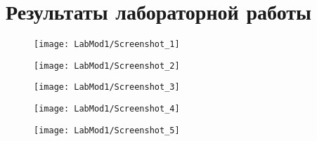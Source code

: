 \documentclass[a4paper,12pt]{article}
\begin{document}
\section{Результаты лабораторной работы}
\begin{figure}
	\centering
	\texttt{[image: LabMod1/Screenshot\_1]}
	\caption{}
	\label{fig:screenshot1}
\end{figure}
\begin{figure}
	\centering
	\texttt{[image: LabMod1/Screenshot\_2]}
	\caption{}
	\label{fig:screenshot2}
\end{figure}
\begin{figure}
	\centering
	\texttt{[image: LabMod1/Screenshot\_3]}
	\caption{}
	\label{fig:screenshot3}
\end{figure}
\begin{figure}
	\centering
	\texttt{[image: LabMod1/Screenshot\_4]}
	\caption{}
	\label{fig:screenshot4}
\end{figure}
\begin{figure}
	\centering
	\texttt{[image: LabMod1/Screenshot\_5]}
	\caption{}
	\label{fig:screenshot5}
\end{figure}
\end{document}
